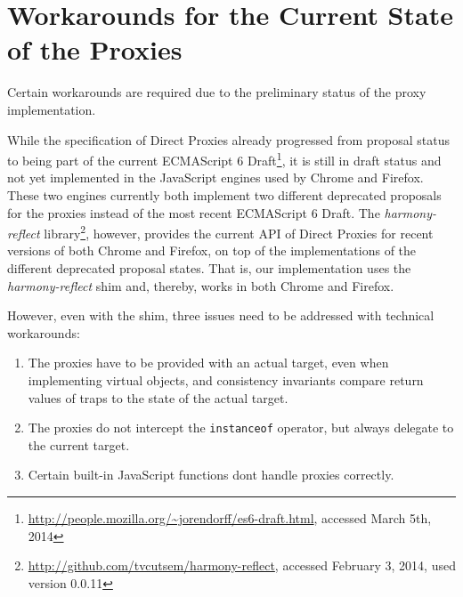










\section{Workarounds for the Current State of the Proxies} \label{sec:IMPLEMENTATION:4}

Certain workarounds are required due to the preliminary status of the proxy implementation.

While the specification of Direct Proxies already progressed from proposal status to being part of the current ECMAScript 6 Draft\footnote{\url{http://people.mozilla.org/~jorendorff/es6-draft.html}, accessed March 5th, 2014}, it is still in draft status and not yet implemented in the JavaScript engines used by Chrome and Firefox.
These two engines currently both implement two different deprecated proposals for the proxies instead of the most recent ECMAScript 6 Draft.
The \emph{harmony-reflect} library\footnote{\url{http://github.com/tvcutsem/harmony-reflect}, accessed February 3, 2014, used version 0.0.11}, however, provides the current API of Direct Proxies for recent versions of both Chrome and Firefox, on top of the implementations of the different deprecated proposal states.
That is, our implementation uses the \emph{harmony-reflect} shim and, thereby, works in both Chrome and Firefox.

However, even with the shim, three issues need to be addressed with technical workarounds:

\begin{enumerate}
    \item The proxies have to be provided with an actual target, even when implementing virtual objects, and consistency invariants compare return values of traps to the state of the actual target. 
    \item The proxies do not intercept the \lstinline{instanceof} operator, but always delegate to the current target.
    \item Certain built-in JavaScript functions dont handle proxies correctly.
\end{enumerate}

